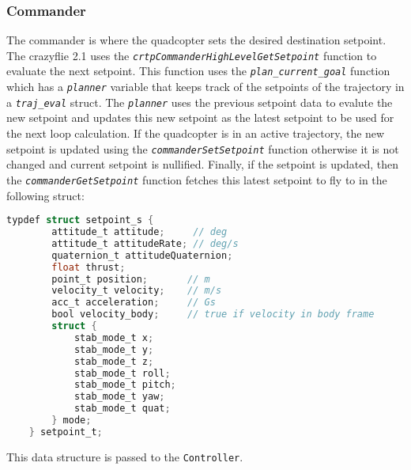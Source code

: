 \documentclass[10pt, a4paper]{article}
\newcommand{\textFunc}[1]{\texttt{\textit{#1}}}
\newcommand{\textDef}[1]{\texttt{#1}}
\begin{document}
    \subsubsection{Commander}
    \label{commander}
        The commander is where the quadcopter sets the desired destination setpoint. The crazyflie 2.1 uses  the \textFunc{crtpCommanderHighLevelGetSetpoint} function to evaluate the next setpoint. This function uses the \textFunc{plan\_current\_goal} function which has a \textFunc{planner} variable that keeps track of the setpoints of the trajectory in a \textFunc{traj\_eval} struct. The \textFunc{planner} uses the previous setpoint data to evalute the new setpoint and updates this new setpoint as the latest setpoint to be used for the next loop calculation. If the quadcopter is in an active trajectory, the new setpoint is updated using the \textFunc{commanderSetSetpoint} function otherwise it is not changed and current setpoint is nullified. Finally, if the setpoint is updated, then the \textFunc{commanderGetSetpoint} function fetches this latest setpoint to fly to in the following struct:
        \begin{lstlisting}[language=C]
    typdef struct setpoint_s {
        attitude_t attitude;     // deg
        attitude_t attitudeRate; // deg/s
        quaternion_t attitudeQuaternion;
        float thrust;
        point_t position;       // m
        velocity_t velocity;    // m/s
        acc_t acceleration;     // Gs
        bool velocity_body;     // true if velocity in body frame
        struct {
            stab_mode_t x;
            stab_mode_t y;
            stab_mode_t z;
            stab_mode_t roll;
            stab_mode_t pitch;
            stab_mode_t yaw;
            stab_mode_t quat;
        } mode;
    } setpoint_t;
        \end{lstlisting}
        This data structure is passed to the \textDef{Controller}.
 
\end{document}
